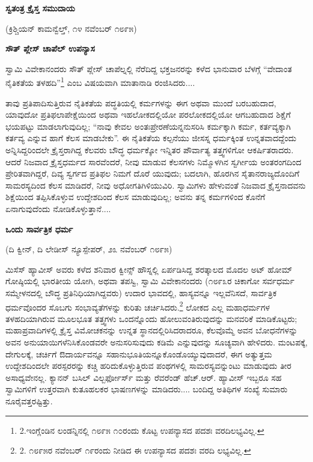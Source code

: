 \begin{center}
\textbf{ಸ್ವತಂತ್ರ ಕ್ರೈಸ್ತ ಸಮುದಾಯ}
\end{center}

\begin{center}
(ಕ್ರಿಶ್ಚಿಯನ್ ಕಾಮನ್ವೆಲ್ತ್, ೧೪ ನವೆಂಬರ್ ೧೮೯೫)
\end{center}

\begin{center}
\textbf{ಸೌತ್ ಪ್ಲೇಸ್ ಚಾಪೆಲ್ ಉಪನ್ಯಾಸ}
\end{center}

ಸ್ವಾಮಿ ವಿವೇಕಾನಂದರು ಸೌತ್ ಪ್ಲೇಸ್ ಚಾಪೆಲ್ನಲ್ಲಿ ನೆರೆದಿದ್ದ ಭಕ್ತಜನರನ್ನು ಕಳೆದ ಭಾನುವಾರ ಬೆಳಗ್ಗೆ “ವೇದಾಂತ ನೈತಿಕತೆಯ ತಳಹದಿ”\footnote{2.ಇಂಗ್ಲೆಂಡಿನ ಲಂಡನ್ನಿನಲ್ಲಿ ೧೮೯೫ ೧೦ರಂದು ಕೊಟ್ಟ ಉಪನ್ಯಾಸದ ಪದಶಃ ವರದಿಲಭ್ಯವಿಲ್ಲ.} ಎಂಬ ವಿಷಯವಾಗಿ ಮಾತಾನಾಡಿ ರಂಜಿಸಿದರು....

ತಾವು ಪ್ರತಿಪಾದಿಸುತ್ತಿರುವ ನೈತಿಕತೆಯ ಪದ್ಧತಿಯಲ್ಲಿ ಕರ್ಮಗಳನ್ನು ಈಗ ಅಥವಾ ಮುಂದೆ ಬರಬಹುದಾದ, ಯಾವುದೋ ಪ್ರತಿಫಲಾಪೇಕ್ಷೆಯಿಂದ ಅಥವಾ ಇಹಲೋಕದಲ್ಲಿಯೋ ಪರಲೋಕದಲ್ಲಿಯೋ ಆಗಬಹುದಾದ ಶಿಕ್ಷೆಗೆ ಭಯಪಟ್ಟು ಮಾಡಲಾಗುವುದಿಲ್ಲ; “ನಾವು ಕೇವಲ ಅಂತಃಪ್ರೇರಣೆಯನ್ನನುಸರಿಸಿ ಕರ್ಮಕ್ಕಾಗಿ ಕರ್ಮ, ಕರ್ತವ್ಯಕ್ಕಾಗಿ ಕರ್ತವ್ಯ ಎನ್ನುವ ಹಾಗೆ ಕೆಲಸ ಮಾಡಬೇಕು”. ಈ ನೈತಿಕತೆಯ ಕಲ್ಪನೆಯು ಜೀಸಸ್ನ ಧರ್ಮಕ್ಕಿಂತ ಉನ್ನತವಾದದ್ದೆಂದು ಅನ್ನಿಸಿದ್ದರಿಂದಲೇ ಕ್ರೈಸ್ತರಾಗಿದ್ದ ಕೆಲವರು ಬೌದ್ಧ ಧರ್ಮಕ್ಕೋ ಇನ್ನಿತರ ಪೌರ್ವಾತ್ಯ ತತ್ತ್ವಗಳಿಗೋ ಆಕರ್ಷಿತರಾದರು. ಆದರೆ ನಿಜವಾದ ಕ್ರೈಸ್ತಧರ್ಮದ ಸಾರವೆಂದರೆ, ನೀವು ಮಾಡುವ ಕೆಲಸಗಳು ನಿಮ್ಮೊಳಗಿನ ಸ್ವರ್ಗೀಯ ಅಂತರಂಗದಿಂದ ಪ್ರೇರಿತವಾಗಿದ್ದರೆ, ದಿವ್ಯ ಸ್ವರ್ಗದ ಪ್ರತಿಫಲ ನಿಮಗೆ ದೊರೆ ಯುವುದು; ಬದಲಾಗಿ, ಹೊರಗಿನ ಸೈತಾನರಾಜ್ಯದೊಂದಿಗೆ ಸಾಮರಸ್ಯದಿಂದ ಕೆಲಸ ಮಾಡಿದರೆ, ನೀವು ಅಧೋಗತಿಗಿಳಿಯುವಿರಿ. ಸ್ವಾಮಿಗಳು ಹೇಳುವಂತೆ ನಿಜವಾದ ಕ್ರೈಸ್ತನಾದವನು ಶಿಕ್ಷೆಯಿಂದ ತಪ್ಪಿಸಿಕೊಳ್ಳುವ ಉದ್ದೇಶದಿಂದ ಕೆಲಸ ಮಾಡುವುದಿಲ್ಲ; ಅವನು ತನ್ನ ಕರ್ಮಗಳಿಂದ ಕೊನೆಗೆ ಏನಾಗುವುದೆಂದು ನೋಡಿಕೊಳ್ಳುತ್ತಾನೆ....

\begin{center}
\textbf{ಒಂದು ಸಾರ್ವತ್ರಿಕ ಧರ್ಮ}
\end{center}

\begin{center}
(ದಿ ಕ್ವೀನ್, ದಿ ಲೇಡೀಸ್ ನ್ಯೂಸ್ಪೇಪರ್, ೨೩ ನವೆಂಬರ್ ೧೮೯೫)
\end{center}

ಮಿಸೆಸ್ ಹ್ಯಾವೀಸ್ ಅವರು ಕಳೆದ ಶನಿವಾರ ಕ್ವೀನ್ಸ್ ಹೌಸ್ನಲ್ಲಿ ಏರ್ಪಡಿಸಿದ್ದ ಶರತ್ಕಾಲದ ಮೊದಲ ಅಟ್ ಹೋಮ್​ ಗೋಷ್ಠಿಯಲ್ಲಿ ಭಾರತೀಯ ಯೋಗಿ, ಅಥವಾ ತಪಸ್ವಿ, ಸ್ವಾಮಿ ವಿವೇಕಾನಂದರು (೧೮೯೩ರ ಚಿಕಾಗೋ ಸರ್ವಧರ್ಮ ಸಮ್ಮೇಳನದಲ್ಲಿ ಬೌದ್ಧ ಪ್ರತಿನಿಧಿಯಾಗಿದ್ದವರು) ಉದಾರ ಭಾವದಲ್ಲಿ, ಹಾಸ್ಯವನ್ನೂ ಇಲ್ಲವೆನಿಸದೆ, ಸಾರ್ವತ್ರಿಕ ಧರ್ಮವೊಂದರ ಸೊಬಗು ಸಂಭಾವ್ಯತೆಗಳನ್ನು ಕುರಿತು ಚರ್ಚಿಸಿದರು.\footnote{2. ೧೮೯೫ರ ನವೆಂಬರ್ ೧೯ರಂದು ನೀಡಿದ ಈ ಉಪನ್ಯಾಸದ ಪದಶಃ ವರದಿ ಲಭ್ಯವಿಲ್ಲ.} ಲೋಕದ ಎಲ್ಲ ಮಹಾಧರ್ಮಗಳ ತಳಹದಿಯಾಗಿರುವ ಮೂಲಭೂತ ತತ್ತ್ವಗಳು ಒಂದನ್ನೊಂದು ಹೋಲುವಂತಿರುವುದನ್ನು ಮನವರಿಕೆ ಮಾಡಿಕೊಟ್ಟರು; ಮಹಾಪ್ರವಾದಿಗಳಲ್ಲಿ ಕ್ರೈಸ್ತ ವಿಮೋಚಕನನ್ನು ಉನ್ನತ ಸ್ಥಾನದಲ್ಲಿರಿಸಿದರಾದರೂ, ಕೆಲವೊಮ್ಮೆ ಅವನ ಬೋಧನೆಗಳನ್ನು ಅವನ ಅನುಯಾಯಿಗಳೆನಿಸಿಕೊಂಡವರೇ ಅನುಸರಿಸುವುದು ಕಡಿಮೆ ಎನ್ನುವುದನ್ನು ಸೂಚ್ಯವಾಗಿ ಹೇಳಿದರು. ಮಂಟಪಕ್ಕೆ, ದೇಗುಲಕ್ಕೆ, ಚರ್ಚಿಗೆ ಔದಾರ್ಯವನ್ನೂ ಸಹಾನುಭೂತಿಯನ್ನೂಕೊಂಡೊಯ್ಯುವುದಾದರೆ, ಈಗ ಅತ್ಯುತ್ತಮ ಉದ್ದೇಶದಿಂದಲೇ ಪರಸ್ಪರರನ್ನು ಕಚ್ಚಿ ಹರಿದುಕೊಳ್ಳುತ್ತಿರುವ ಪಂಥಗಳಲ್ಲಿ ಸಾಮರಸ್ಯವನ್ನುಂಟು ಮಾಡುವುದು ತೀರ ಅಸಾಧ್ಯವೇನಲ್ಲ. ಕ್ಯಾನನ್ ಬಸಿಲ್ ವಿಲ್ಬರ್ಫೋರ್ಸ್ ಮತ್ತು ರೆವರೆಂಡ್ ಹೆಚ್.ಆರ್. ಹ್ಯಾವೀಸ್ ಇಬ್ಬರೂ ಸಹ ಸ್ವಾಮಿಗಳಿಗೆ ಉತ್ತರವಾಗಿ ಕುತೂಹಲಕರ ಭಾಷಣಗಳನ್ನು ಮಾಡಿದರು.... ಬಂದಿದ್ದ ಅತಿಥಿಗಳ ಸಂಖ್ಯೆ ಸುಮಾರು ನೂರೈವತ್ತರಷ್ಟಿತ್ತು.

